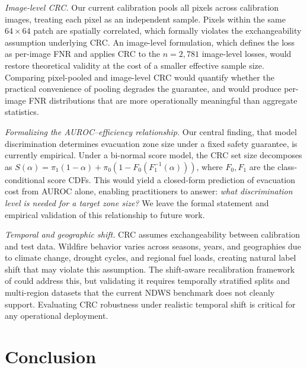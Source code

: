 \documentclass{article}
\begin{document}
\textit{Image-level CRC.}
Our current calibration pools all pixels across calibration images, treating each pixel as an independent sample.
Pixels within the same $64{\times}64$ patch are spatially correlated, which formally violates the exchangeability assumption underlying CRC.
An image-level formulation, which defines the loss as per-image FNR and applies CRC to the $n{=}2{,}781$ image-level losses, would restore theoretical validity at the cost of a smaller effective sample size.
Comparing pixel-pooled and image-level CRC would quantify whether the practical convenience of pooling degrades the guarantee, and would produce per-image FNR distributions that are more operationally meaningful than aggregate statistics.

\textit{Formalizing the AUROC--efficiency relationship.}
Our central finding, that model discrimination determines evacuation zone size under a fixed safety guarantee, is currently empirical.
Under a bi-normal score model, the CRC set size decomposes as $S(\alpha) = \pi_1(1{-}\alpha) + \pi_0(1 - F_0(F_1^{-1}(\alpha)))$, where $F_0, F_1$ are the class-conditional score CDFs.
This would yield a closed-form prediction of evacuation cost from AUROC alone, enabling practitioners to answer: \emph{what discrimination level is needed for a target zone size?}
We leave the formal statement and empirical validation of this relationship to future work.

\textit{Temporal and geographic shift.}
CRC assumes exchangeability between calibration and test data.
Wildfire behavior varies across seasons, years, and geographies due to climate change, drought cycles, and regional fuel loads, creating natural label shift that may violate this assumption.
The shift-aware recalibration framework of \citet{angelopoulos2022conformal} could address this, but validating it requires temporally stratified splits and multi-region datasets that the current NDWS benchmark does not cleanly support.
Evaluating CRC robustness under realistic temporal shift is critical for any operational deployment.


\section{Conclusion}
\end{document}
